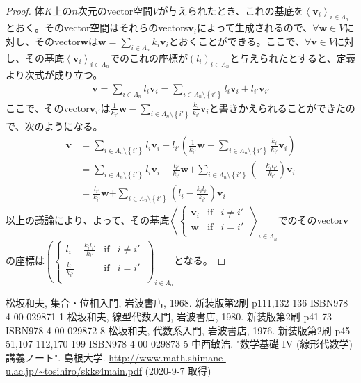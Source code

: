 \documentclass[dvipdfmx]{jsarticle}
\begin{document}
\begin{proof}
体$K$上の$n$次元のvector空間$V$が与えられたとき、これの基底を$\left\langle \mathbf{v}_{i} \right\rangle_{i \in \varLambda_{n}}$とおく。そのvector空間はそれらのvectors$\mathbf{v}_{i}$によって生成されるので、$\forall\mathbf{w} \in V$に対し、そのvector$\mathbf{w}$は$\mathbf{w} = \sum_{i \in \varLambda_{n}} {k_{i}\mathbf{v}_{i}}$とおくことができる。ここで、$\forall\mathbf{v} \in V$に対し、その基底$\left\langle \mathbf{v}_{i} \right\rangle_{i \in \varLambda_{n}}$でのこれの座標が$\left( l_{i} \right)_{i \in \varLambda_{n}}$と与えられたとすると、定義より次式が成り立つ。
\begin{align*}
\mathbf{v} = \sum_{i \in \varLambda_{n}} {l_{i}\mathbf{v}_{i}} = \sum_{i \in \varLambda_{n} \setminus \left\{ i' \right\}} {l_{i}\mathbf{v}_{i}} + l_{i'}\mathbf{v}_{i'}
\end{align*}
ここで、そのvector$\mathbf{v}_{i'}$は$\frac{1}{k_{i'}}\mathbf{w} - \sum_{i \in \varLambda_{n} \setminus \left\{ i' \right\}} {\frac{k_{i}}{k_{i'}}\mathbf{v}_{i}}$と書きかえられることができたので、次のようになる。
\begin{align*}
\mathbf{v} &= \sum_{i \in \varLambda_{n} \setminus \left\{ i' \right\}} {l_{i}\mathbf{v}_{i}} + l_{i'}\left( \frac{1}{k_{i'}}\mathbf{w} - \sum_{i \in \varLambda_{n} \setminus \left\{ i' \right\}} {\frac{k_{i}}{k_{i'}}\mathbf{v}_{i}} \right)\\
&= \sum_{i \in \varLambda_{n} \setminus \left\{ i' \right\}} {l_{i}\mathbf{v}_{i}} + \frac{l_{i'}}{k_{i'}}\mathbf{w}\mathbf{+}\sum_{i \in \varLambda_{n} \setminus \left\{ i' \right\}} {\left( - \frac{k_{i}l_{i'}}{k_{i'}} \right)\mathbf{v}_{i}}\\
&= \frac{l_{i'}}{k_{i'}}\mathbf{w}\mathbf{+}\sum_{i \in \varLambda_{n} \setminus \left\{ i' \right\}} {\left( l_{i} - \frac{k_{i}l_{i'}}{k_{i'}} \right)\mathbf{v}_{i}}
\end{align*}
以上の議論により、よって、その基底$\left\langle \left\{ \begin{matrix}
\mathbf{v}_{i} & \mathrm{if}  & i \neq i' \\
\mathbf{w} & \mathrm{if}  & i = i' \\
\end{matrix} \right.\  \right\rangle_{i \in \varLambda_{n}}$でのそのvector$\mathbf{v}$の座標は$\left( \left\{ \begin{matrix}
l_{i} - \frac{k_{i}l_{i'}}{k_{i'}} & \mathrm{if}  & i \neq i' \\
\frac{l_{i'}}{k_{i'}} & \mathrm{if}  & i = i' \\
\end{matrix} \right.\  \right)_{i \in \varLambda_{n}}$となる。
\end{proof}
\begin{thebibliography}{50}
  松坂和夫, 集合・位相入門, 岩波書店, 1968. 新装版第2刷 p111,132-136 ISBN978-4-00-029871-1
  松坂和夫, 線型代数入門, 岩波書店, 1980. 新装版第2刷 p41-73 ISBN978-4-00-029872-8
  松坂和夫, 代数系入門, 岩波書店, 1976. 新装版第2刷 p45-51,107-112,170-199 ISBN978-4-00-029873-5
  中西敏浩. "数学基礎 IV (線形代数学) 講義ノート". 島根大学. \url{http://www.math.shimane-u.ac.jp/~tosihiro/skks4main.pdf} (2020-9-7 取得)
\end{thebibliography}
\end{document}
